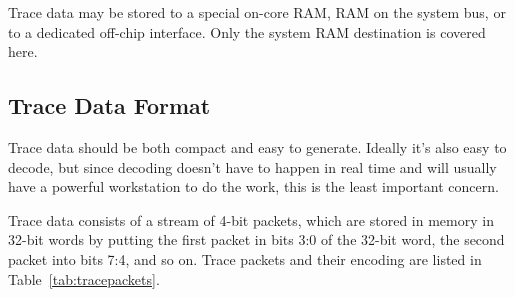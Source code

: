 \documentclass{article}
\begin{document}
Trace data may be stored to a special on-core RAM, RAM on the system bus, or to
a dedicated off-chip interface. Only the system RAM destination is covered
here.

\subsection{Trace Data Format}

Trace data should be both compact and easy to generate. Ideally it's also easy
to decode, but since decoding doesn't have to happen in real time and will
usually have a powerful workstation to do the work, this is the least important
concern.

Trace data consists of a stream of 4-bit packets, which are stored in memory in
32-bit words by putting the first packet in bits 3:0 of the 32-bit word, the
second packet into bits 7:4, and so on. Trace packets and their encoding are
listed in Table~\ref{tab:tracepackets}.
\end{document}
